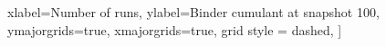 		xlabel={Number of runs},
		ylabel={Binder cumulant at snapshot 100},
		ymajorgrids=true,
		xmajorgrids=true,
		grid style = dashed,
		]
